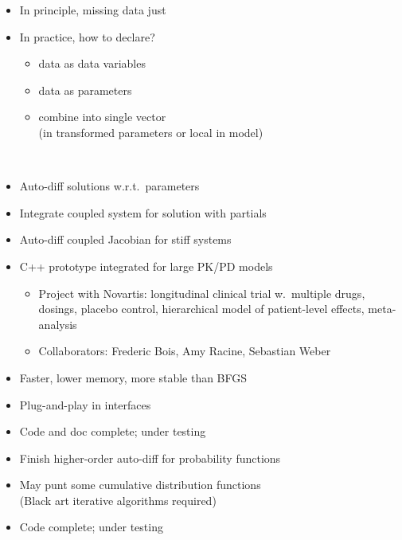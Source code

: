 \documentclass[10pt]{report}
\newcommand{\sld}[1]{\newpage{\noindent\LARGE \ \ \
    \textcolor{MidnightBlue}{\bfseries #1}}\vspace*{4pt}}
\newcommand{\spc}{\hspace*{0.25in}}
\newcommand{\myemph}[1]{{\color{MidnightBlue}{\bfseries #1}}}
\newcommand{\mypart}[2]{{\newpage 
\mbox{ }
\vfill
\noindent\spc\color{MidnightBlue}{\LARGE\bfseries #1\\[10pt]\spc\Huge{#2}}
\vfill\vfill}
\mbox{ }}
\begin{document}
\sld{Models with Missing Data}
\begin{itemize}
\item In principle, missing data just \myemph{additional parameters}
\item In practice, how to declare? 
\begin{itemize}
\item \myemph{observed} data as data variables
\item \myemph{missing} data as parameters
\item combine into single vector 
\\ {\footnotesize (in transformed parameters or local in model)}
\end{itemize}
\end{itemize}

\mypart{Part III}{What's Next?}

\sld{Differential Equation Solver}
\begin{itemize}
\item Auto-diff solutions w.r.t.\ parameters
\item Integrate coupled system for solution with partials
\item Auto-diff coupled Jacobian for stiff systems
\vfill
\item C++ prototype integrated for large PK/PD models
\vspace*{-4pt}
\begin{itemize}\footnotesize
\item 
Project with Novartis: 
  longitudinal clinical trial w.\ multiple drugs, dosings, placebo control,
  hierarchical model of patient-level effects, meta-analysis
\item
Collaborators: Frederic Bois, Amy Racine, Sebastian Weber
\end{itemize}
\end{itemize}

\sld{L-BFGS Optimizer}
\begin{itemize}
\item Faster, lower memory, more stable than BFGS
\item Plug-and-play in interfaces
\vfill
\item Code and doc complete; under testing
\end{itemize}

\sld{Higher-Order Auto-diff}
\begin{itemize}
\item Finish higher-order auto-diff for probability functions
\item May punt some cumulative distribution functions
\\
{\footnotesize (Black art iterative algorithms required)}
\vfill
\item Code complete; under testing
\end{itemize}
\end{document}
